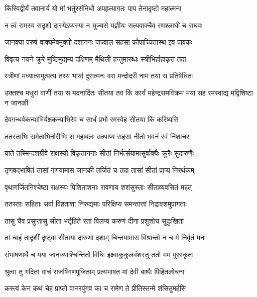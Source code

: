 \twolineshloka
{किंस्विद्वीर्यं तवानार्य यो मां भर्तुरसंनिधौ}
{अपहृत्यागतः पाप तेनादृष्टो महात्मना} %

\twolineshloka
{न त्वं रामस्य सदृशो दास्येऽप्यस्या न युज्यसे}
{यज्ञीयः सत्यवाक्चैव रणश्लाघी च राघवः} %

\twolineshloka
{जानक्या परुषं वाक्यमेवमुक्तो दशाननः}
{जज्वाल सहसा कोपाच्चितास्थ इव पावकः} %

\twolineshloka
{विवृत्य नयने क्रूरे मुष्टिमुद्यम्य दक्षिणम्}
{मैथिलीं हन्तुमारब्धः स्त्रीभिर्हाहाकृतं तदा} %

\twolineshloka
{स्त्रीणां मध्यात्समुत्पत्य तस्य भार्या दुरात्मनः}
{वरा मन्दोदरी नाम तया स प्रतिषेधितः} %

\threelineshloka
{उक्तश्च मधुरां वाणीं तया स मदनार्दितः}
{सीतया तव किं कार्यं महेन्द्रसमविक्रम}
{मया सह रमस्वाद्य मद्विशिष्टा न जानकी} %

\twolineshloka
{देवगन्धर्वकन्याभिर्यक्षकन्याभिरेव च}
{सार्धं प्रभो रमस्वेह सीतया किं करिष्यसि} %

\twolineshloka
{ततस्ताभिः समेताभिर्नारीभिः स महाबलः}
{उत्थाप्य सहसा नीतो भवनं स्वं निशाचरः} %

\twolineshloka
{याते तस्मिन्दशग्रीवे राक्षस्यो विकृताननाः}
{सीतां निर्भर्त्सयामासुर्वाक्यैः क्रूरैः सुदारुणैः} %

\twolineshloka
{तृणवद्भाषितं तासां गणयामास जानकी}
{तर्जितं च तदा तासां सीतां प्राप्य निरर्थकम्} %

\twolineshloka
{वृथागर्जितनिश्चेष्टा राक्षस्यः पिशिताशनाः}
{रावणाय शशंसुस्ताः सीताव्यवसितं महत्} %

\twolineshloka
{ततस्ताः सहिताः सर्वा विहताशा निरुद्यमाः}
{परिक्षिप्य समन्तात्तां निद्रावशमुपागताः} %

\twolineshloka
{तासु चैव प्रसुप्तासु सीता भर्तृहिते रता}
{विलप्य करुणं दीना प्रशुशोच सुदुःखिता} %

\twolineshloka
{तां चाहं तादृशीं दृष्ट्वा सीताया दारुणां दशाम्}
{चिन्तयामास विश्रान्तो न च मे निर्वृतं मनः} %

\twolineshloka
{संभाषणार्थे च मया जानक्याश्चिन्तितो विधिः}
{इक्ष्वाकुकुलवंशस्तु ततो मम पुरस्कृतः} %

\twolineshloka
{श्रुत्वा तु गदितां वाचं राजर्षिगणपूजिताम्}
{प्रत्यभाषत मां देवी बाष्पैः पिहितलोचना} %

\twolineshloka
{कस्त्वं केन कथं चेह प्राप्तो वानरपुंगव}
{का च रामेण ते प्रीतिस्तन्मे शंसितुमर्हसि} %

